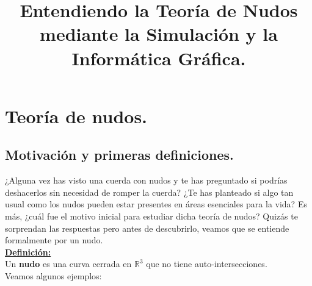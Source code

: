 \documentclass[14pt]{extarticle}
\title{Entendiendo la Teoría de Nudos mediante la Simulación y la Informática Gráfica.}
\begin{document}
\newtheorem{teo}{Teorema}[section]
\newtheorem{pro}{Proposición}[section]
\newtheorem{lem}{Lema}[section]
\newtheorem{cor}{Corolario}[section]
\maketitle

\tableofcontents

\newpage
\section{Teoría de nudos. }\label{PrimerTema}

\subsection{Motivación y primeras definiciones.}
  ¿Alguna vez has visto una cuerda con nudos y te has preguntado si podrías deshacerlos sin necesidad de romper la cuerda? ¿Te has planteado si algo tan usual como los nudos pueden estar presentes en áreas esenciales para la vida? Es más, ¿cuál fue el motivo inicial para estudiar dicha teoría de nudos? Quizás te sorprendan las respuestas pero antes de descubrirlo, veamos que se entiende formalmente por un nudo.\\
  
\underline{\textbf{Definición:}}\\
 Un \textbf{nudo} es una curva cerrada en $\mathds{R}^{3}$ que no tiene auto-intersecciones.\\

Veamos algunos ejemplos:\\
\end{document}
